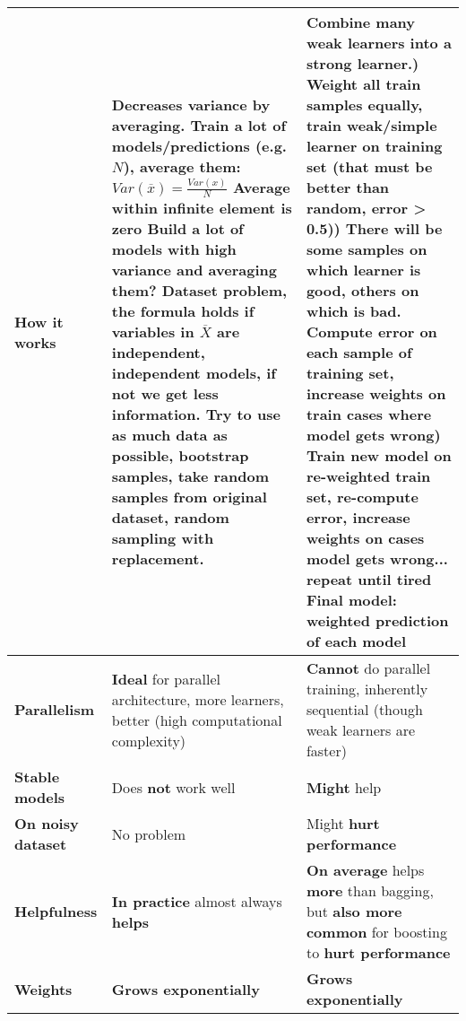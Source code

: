 \begin{tabularx}{\linewidth}{p{}|X|X}
        \textbf{How it works} & \textbf{Decreases variance by averaging}.\newline
        Train a lot of models/predictions (e.g. $N$), \textbf{average} them:
        \newline\newline $Var(\overline{x})=\frac{Var(x)}{N}$\newline\newline
        Average within infinite element is zero\newline
        Build a lot of models with high variance and averaging them? \textbf{Dataset problem, the formula holds if variables in $\overline{X}$ are independent, independent models, if not we get less information}.\newline
        Try to use as much data as possible, \textbf{bootstrap samples}, take random samples from original dataset, random sampling with replacement. & 
        Combine many weak learners into a strong learner.\newline\newline
        1) \textbf{Weight all train samples equally, train weak/simple learner on training set} (that must be better than random, error > 0.5)\newline\newline
        2) There will be some samples on which learner is good, others on which is bad. \textbf{Compute error on each sample of training set, increase weights on train cases where model gets wrong}\newline\newline
        3) \textbf{Train new model on re-weighted train set}, re-compute error, increase weights on cases model gets wrong... \textbf{repeat until tired}\newline\newline
        Final model: \textbf{weighted} prediction of each model
        \\ \midrule

        \textbf{Parallelism} & \textbf{Ideal} for parallel architecture, more learners, better (high computational complexity) & \textbf{Cannot} do parallel training, inherently sequential (though weak learners are faster)\\ \midrule

        \textbf{Stable models} & Does \textbf{not} work well & \textbf{Might} help\\ \midrule

        \textbf{On noisy dataset} & No problem & Might \textbf{hurt performance}\\ \midrule

        \textbf{Helpfulness} & \textbf{In practice} almost always \textbf{helps} & \textbf{On average} helps \textbf{more} than bagging, but \textbf{also more common} for boosting to \textbf{hurt performance}\\ \midrule

        \textbf{Weights} & \textbf{Grows exponentially} & \textbf{Grows exponentially}

    \end{tabularx}